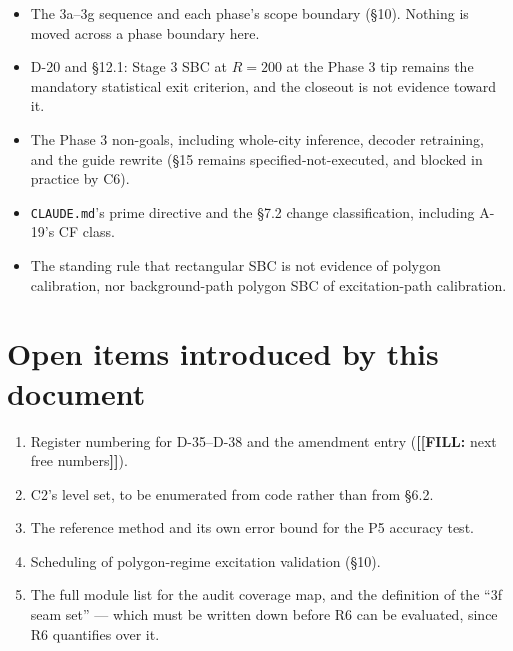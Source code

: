 \documentclass[11pt]{article}
\newcommand{\fillanchor}[1]{{\color{red}\textbf{[[FILL:} #1\textbf{]]}}}
\renewcommand{\tt}[1]{\texttt{#1}}
\begin{document}
\begin{itemize}
  \item The 3a--3g sequence and each phase's scope boundary (\S10). Nothing is moved
  across a phase boundary here.
  \item D-20 and \S12.1: Stage 3 SBC at $R=200$ at the Phase 3 tip remains the mandatory
  statistical exit criterion, and the closeout is not evidence toward it.
  \item The Phase 3 non-goals, including whole-city inference, decoder retraining, and the
  guide rewrite (\S15 remains specified-not-executed, and blocked in practice by C6).
  \item \tt{CLAUDE.md}'s prime directive and the \S7.2 change classification, including
  A-19's CF class.
  \item The standing rule that rectangular SBC is not evidence of polygon calibration, nor
  background-path polygon SBC of excitation-path calibration.
\end{itemize}

\section{Open items introduced by this document}

\begin{enumerate}[leftmargin=1.8em]
  \item Register numbering for D-35--D-38 and the amendment entry
  (\fillanchor{next free numbers}).
  \item C2's level set, to be enumerated from code rather than from \S6.2.
  \item The reference method and its own error bound for the P5 accuracy test.
  \item Scheduling of polygon-regime excitation validation (\S10).
  \item The full module list for the audit coverage map, and the definition of the ``3f
  seam set'' --- which must be written down before R6 can be evaluated, since R6 quantifies
  over it.
\end{enumerate}
\end{document}
